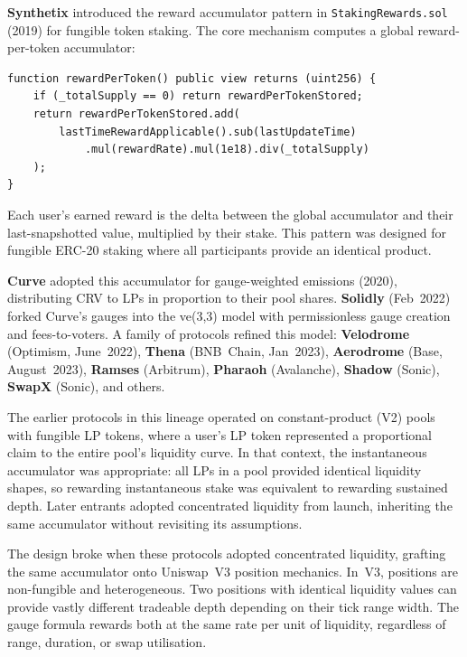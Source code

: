 \documentclass[11pt,a4paper]{article}
\theoremstyle{definition}
\begin{document}
\textbf{Synthetix} introduced the reward accumulator pattern in \texttt{StakingRewards.sol} (2019) for fungible token staking. The core mechanism computes a global reward-per-token accumulator:


\begin{center}\begin{minipage}{0.85\textwidth}\begin{verbatim}
function rewardPerToken() public view returns (uint256) {
    if (_totalSupply == 0) return rewardPerTokenStored;
    return rewardPerTokenStored.add(
        lastTimeRewardApplicable().sub(lastUpdateTime)
            .mul(rewardRate).mul(1e18).div(_totalSupply)
    );
}
\end{verbatim}\end{minipage}\end{center}


Each user's earned reward is the delta between the global accumulator and their last-snapshotted value, multiplied by their stake. This pattern was designed for fungible ERC-20 staking where all participants provide an identical product.

\textbf{Curve} adopted this accumulator for gauge-weighted emissions (2020), distributing CRV to LPs in proportion to their pool shares. \textbf{Solidly} (Feb~2022) forked Curve's gauges into the ve(3,3) model with permissionless gauge creation and fees-to-voters. A family of protocols refined this model: \textbf{Velodrome} (Optimism, June~2022), \textbf{Thena} (BNB~Chain, Jan~2023), \textbf{Aerodrome} (Base, August~2023), \textbf{Ramses} (Arbitrum), \textbf{Pharaoh} (Avalanche), \textbf{Shadow} (Sonic), \textbf{SwapX} (Sonic), and others.

The earlier protocols in this lineage operated on constant-product (V2) pools with fungible LP tokens, where a user's LP token represented a proportional claim to the entire pool's liquidity curve. In that context, the instantaneous accumulator was appropriate: all LPs in a pool provided identical liquidity shapes, so rewarding instantaneous stake was equivalent to rewarding sustained depth. Later entrants adopted concentrated liquidity from launch, inheriting the same accumulator without revisiting its assumptions.

The design broke when these protocols adopted concentrated liquidity, grafting the same accumulator onto Uniswap~V3 position mechanics. In~V3, positions are non-fungible and heterogeneous. Two positions with identical liquidity values can provide vastly different tradeable depth depending on their tick range width. The gauge formula rewards both at the same rate per unit of liquidity, regardless of range, duration, or swap utilisation.
\end{document}
